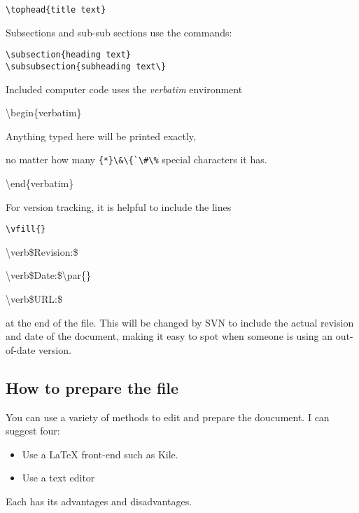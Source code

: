 \begin{verbatim}
\tophead{title text}
\end{verbatim}
Subsections and sub-sub sections use the commands:

\begin{verbatim}
\subsection{heading text}
\subsubsection{subheading text\}
\end{verbatim}

Included computer code uses the \textit{verbatim} environment


{\ttfamily\textbackslash{}begin\{verbatim\}

Anything typed here will be printed exactly,

no matter how many \verb={*}\&\{`\#\%= special characters it has. 

\textbackslash{}end\{verbatim\}
}

For version tracking, it is helpful to include the lines

{\ttfamily
	\verb|\vfill{}|

	\textbackslash{}verb\$Revision:\$

	\textbackslash{}verb\$Date:\$\textbackslash{}par\{\}

	\textbackslash{}verb\$URL:\$

}

at the end of the file. This will be changed by SVN to include the
actual revision and date of the document, making it easy to spot when
someone is using an out-of-date version.


\subsection{How to prepare the file}

You can use a variety of methods to edit and prepare the doucument.
I can suggest four:

\begin{itemize}
\item Use a \LaTeX{} front-end such as Kile.
\item Use a text editor
\end{itemize}
Each has its advantages and disadvantages. 

